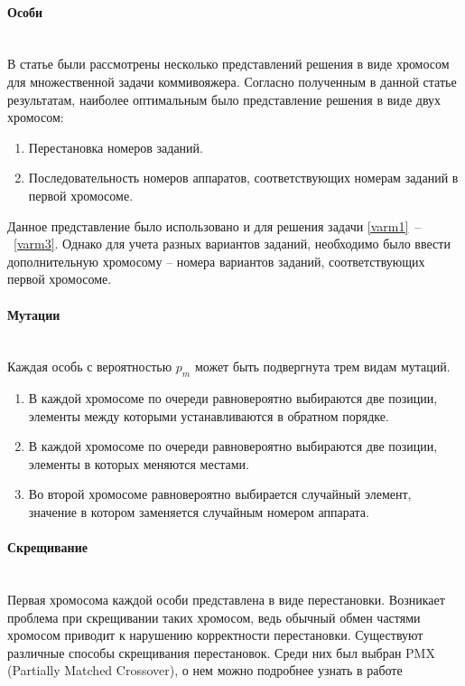 \documentclass[a4paper,14pt,russian]{article}
\begin{document}
\paragraph{Особи} ~\\
В статье \cite{kiraly2010novel} были рассмотрены несколько представлений решения в виде хромосом для множественной задачи коммивояжера. Согласно полученным в данной статье результатам, наиболее оптимальным было представление решения в виде двух хромосом:
\begin{enumerate}
\item Перестановка номеров заданий.
\item Последовательность номеров аппаратов, соответствующих номерам заданий в первой хромосоме.
\end{enumerate}

Данное представление было использовано и для решения задачи \eqref{varm1}~--~\eqref{varm3}. Однако для учета разных вариантов заданий, необходимо было ввести дополнительную хромосому -- номера вариантов заданий, соответствующих первой хромосоме.

\paragraph{Мутации} ~\\
Каждая особь с вероятностью $p_m$ может быть подвергнута трем видам мутаций.
\begin{enumerate}
\item В каждой хромосоме по очереди равновероятно выбираются две позиции, элементы между которыми устанавливаются в обратном порядке.
\item В каждой хромосоме по очереди равновероятно выбираются две позиции, элементы в которых меняются местами.
\item Во второй хромосоме равновероятно выбирается случайный элемент, значение в котором заменяется случайным номером аппарата.
\end{enumerate}


\paragraph{Скрещивание} ~\\
Первая хромосома каждой особи представлена в виде перестановки. Возникает проблема при скрещивании таких хромосом, ведь обычный обмен частями хромосом приводит к нарушению корректности перестановки. Существуют различные способы скрещивания перестановок. Среди них был выбран PMX (Partially Matched Crossover), о нем можно подробнее узнать в работе \cite{goldberg1985alleles}
\end{document}

